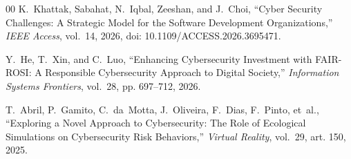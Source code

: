 \documentclass[conference]{IEEEtran}
\begin{document}
\begin{thebibliography}{00}
K.~Khattak, Sabahat, N.~Iqbal, Zeeshan, and J.~Choi, ``Cyber Security Challenges: A Strategic Model for the Software Development Organizations,'' \emph{IEEE Access}, vol.~14, 2026, doi: 10.1109/ACCESS.2026.3695471.

Y.~He, T.~Xin, and C.~Luo, ``Enhancing Cybersecurity Investment with FAIR-ROSI: A Responsible Cybersecurity Approach to Digital Society,'' \emph{Information Systems Frontiers}, vol.~28, pp. 697--712, 2026.

T.~Abril, P.~Gamito, C.~da~Motta, J.~Oliveira, F.~Dias, F.~Pinto, et~al., ``Exploring a Novel Approach to Cybersecurity: The Role of Ecological Simulations on Cybersecurity Risk Behaviors,'' \emph{Virtual Reality}, vol.~29, art. 150, 2025.

\end{thebibliography}
\end{document}
